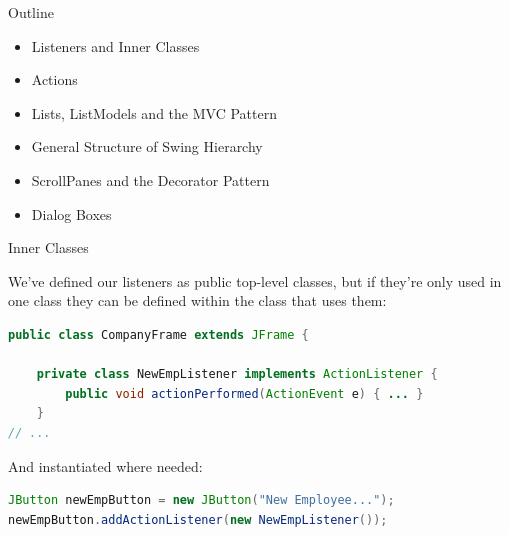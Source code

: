 \documentclass{beamer}
\author[Chris Simpkins] 
{Christopher Simpkins \\\texttt{chris.simpkins@gatech.edu}}
\institute[Georgia Tech] %
\date[CS 1331]{}
\begin{document}
\begin{frame}
  \titlepage
\end{frame}

\begin{frame}[fragile]{Outline}


\begin{itemize}
\item Listeners and Inner Classes
\item Actions
\item Lists, ListModels and the MVC Pattern
\item General Structure of Swing Hierarchy
\item ScrollPanes and the Decorator Pattern
\item Dialog Boxes
\end{itemize}


\end{frame}

\begin{frame}[fragile]{Inner Classes}


We've defined our listeners as public top-level classes, but if they're only used in one class they can be defined within the class that uses them:

\begin{lstlisting}[language=Java]
public class CompanyFrame extends JFrame {

    private class NewEmpListener implements ActionListener {
        public void actionPerformed(ActionEvent e) { ... }
    }
// ...
\end{lstlisting}

And instantiated where needed:

\begin{lstlisting}[language=Java]
JButton newEmpButton = new JButton("New Employee...");
newEmpButton.addActionListener(new NewEmpListener());
\end{lstlisting}


\end{frame}
\end{document}
